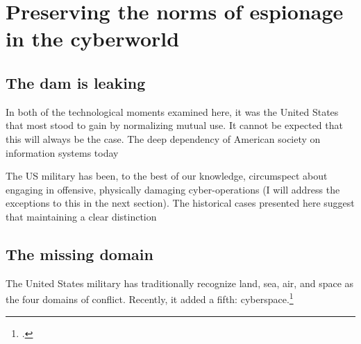 \documentclass{report}
\begin{document}




\section{Preserving the norms of espionage in the cyberworld}
\subsection{The dam is leaking}
In both of the technological moments examined here, it was the United States that most stood to gain by normalizing mutual use. It cannot be expected that this will always be the case. The deep dependency of American society on information systems today

The US military has been, to the best of our knowledge, circumspect about engaging in offensive, physically damaging cyber-operations (I will address the exceptions to this in the next section). The historical cases presented here suggest that maintaining a clear distinction

\subsection{The missing domain}
The United States military has traditionally recognize land, sea, air, and space as the four domains of conflict. Recently, it added a fifth: cyberspace.\footcite{carafano_americas_2018}
\end{document}
